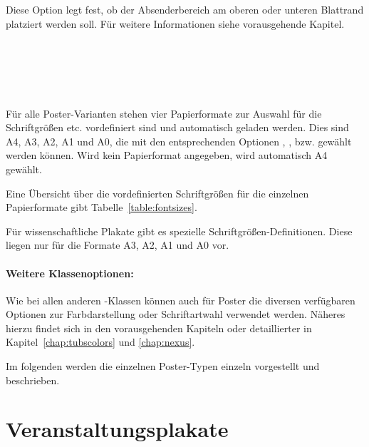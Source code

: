 \begin{Declaration}
\end{Declaration}

Diese Option legt fest, ob der Absenderbereich am oberen oder unteren Blattrand
platziert werden soll. Für weitere Informationen siehe vorausgehende Kapitel.


\begin{Declaration}
  \\
  \\
  \\
  \\
\end{Declaration}

Für alle Poster-Varianten stehen vier Papierformate zur Auswahl für die
Schriftgrößen etc. vordefiniert sind und automatisch geladen werden.
Dies sind A4, A3, A2, A1 und A0, die mit den entsprechenden Optionen
, ,  bzw. 
gewählt werden können.
Wird kein Papierformat angegeben, wird automatisch A4 gewählt.

Eine Übersicht über die vordefinierten Schriftgrößen für die einzelnen
Papierformate gibt Tabelle~\ref{table:fontsizes}.

\begin{important}
  Für wissenschaftliche Plakate gibt es spezielle Schriftgrößen-Definitionen.
  Diese liegen nur für die Formate A3, A2, A1 und A0 vor.
\end{important}


\paragraph{Weitere Klassenoptionen:}

Wie bei allen anderen \tubslatex-Klassen können auch für Poster
die diversen verfügbaren Optionen zur Farbdarstellung oder Schriftartwahl
verwendet werden.
Näheres hierzu findet sich in den vorausgehenden Kapiteln oder detaillierter
in Kapitel~\ref{chap:tubscolors} und \ref{chap:nexus}.
\bigskip

Im folgenden werden die einzelnen Poster-Typen einzeln vorgestellt und beschrieben.

\clearpage
\section{Veranstaltungsplakate}

